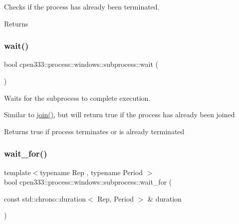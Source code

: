 Checks if the process has already been terminated. 

\begin{DoxyReturn}{Returns}

\end{DoxyReturn}
\mbox{\label{classcpen333_1_1process_1_1windows_1_1subprocess_a54fe40167d1bf23bce4195c5aa34ec5f}} 
\subsubsection{\texorpdfstring{wait()}{wait()}}
{\footnotesize\ttfamily bool cpen333\+::process\+::windows\+::subprocess\+::wait (\begin{DoxyParamCaption}{ }\end{DoxyParamCaption})\hspace{0.3cm}{\ttfamily [inline]}}



Waits for the subprocess to complete execution. 

Similar to \hyperlink{classcpen333_1_1process_1_1windows_1_1subprocess_a973a466ad1f7299d1511e4a0628bc3f4}{join()}, but will return true if the process has already been joined

\begin{DoxyReturn}{Returns}
true if process terminates or is already terminated 
\end{DoxyReturn}
\mbox{\label{classcpen333_1_1process_1_1windows_1_1subprocess_aed7bf88b47dfa88ba8c97d6dbc94c124}} 
\subsubsection{\texorpdfstring{wait\+\_\+for()}{wait\_for()}}
{\footnotesize\ttfamily template$<$typename Rep , typename Period $>$ \\
bool cpen333\+::process\+::windows\+::subprocess\+::wait\+\_\+for (\begin{DoxyParamCaption}\item[{const std\+::chrono\+::duration$<$ Rep, Period $>$ \&}]{duration }\end{DoxyParamCaption})\hspace{0.3cm}{\ttfamily [inline]}}



